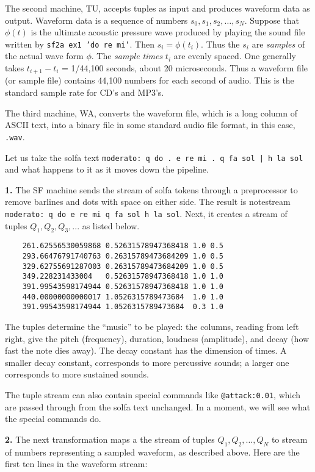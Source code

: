 \documentclass[11pt]{amsart}
\begin{document}
The second machine, TU, accepts tuples as input and produces waveform data as 
output. Waveform data is a sequence of numbers $s_0, s_1, s_2, \ldots, s_N$.
Suppose that $\phi(t)$ is the ultimate acoustic pressure wave produced by playing 
the sound file written by {\tt sf2a ex1 'do re mi'}.  Then $s_i = \phi(t_i)$.
Thus the $s_i$ are \emph{samples} of the actual wave form $\phi$. The \emph{sample times}
$t_i$ are evenly spaced.  One generally takes $t_{i+1} - t_{i}$ = 1/44,100 seconds,
about 20 microseconds.  Thus a waveform file (or sample file) contains 44,100 numbers
for each second of audio. This is the standard sample rate for CD's and MP3's.

The third machine, WA, converts the waveform file, which is a long column of ASCII text,
into a binary file in some standard audio file format, in this case, {\tt.wav}.

Let us take the solfa text {\tt moderato: q do . e re mi . q fa sol | h la sol} and 
what happens to it as it moves down the pipeline.

{\bf 1.} The SF machine sends the stream of solfa tokens through
a preprocessor to remove barlines and dots with space on either side.
The result is notestream {\tt moderato: q do e re mi q fa sol  h la sol}.  Next,
it creates a stream
of tuples $Q_1, Q_2, Q_3, ...$ as listed below.
\begin{verbatim}
    261.62556530059868 0.52631578947368418 1.0 0.5 
    293.66476791740763 0.26315789473684209 1.0 0.5 
    329.62755691287003 0.26315789473684209 1.0 0.5 
    349.228231433004   0.52631578947368418 1.0 1.0 
    391.99543598174944 0.52631578947368418 1.0 1.0 
    440.00000000000017 1.0526315789473684  1.0 1.0 
    391.99543598174944 1.0526315789473684  0.3 1.0 
 \end{verbatim}
The tuples determine the ``music'' to be played: the
columns, reading from left right, give the pitch (frequency),
duration, loudness (amplitude), and decay (how fast the note dies away).
The decay constant has the dimension of times.  A smaller decay constant,
corresponds to more percussive sounds; a larger one corresponds to more sustained sounds.

The tuple stream can also contain special commands like {\tt @attack:0.01},
which are passed through from the solfa text unchanged.   In a moment, we will
see what the special commands do.

{\bf 2.} The next transformation maps a the stream of tuples $Q_1, Q_2, \ldots ,Q_N$ to 
stream of numbers representing a sampled waveform, as described above.  Here
are the first ten lines in the waveform stream:
\end{document}
